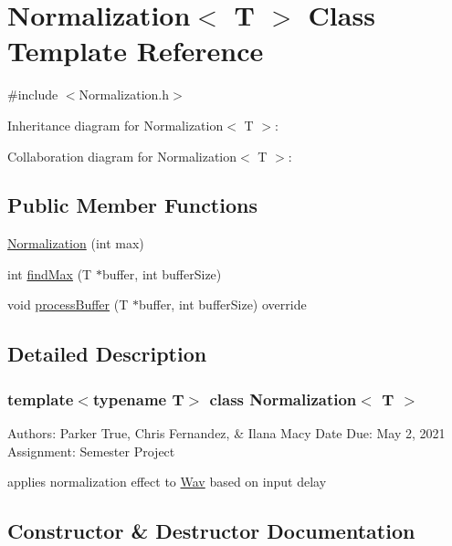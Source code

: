 \hypertarget{classNormalization}{}\section{Normalization$<$ T $>$ Class Template Reference}
\label{classNormalization}


{\ttfamily \#include $<$Normalization.\+h$>$}



Inheritance diagram for Normalization$<$ T $>$\+:


Collaboration diagram for Normalization$<$ T $>$\+:
\subsection*{Public Member Functions}
\begin{DoxyCompactItemize}
\item 
\hyperlink{classNormalization_a70f7d23e000cbdd8c0067a981b44ebe9}{Normalization} (int max)
\item 
int \hyperlink{classNormalization_a0ca4f15e6f0d23ec77c2946583e248b6}{find\+Max} (T $\ast$buffer, int buffer\+Size)
\item 
void \hyperlink{classNormalization_a0f441de817c3dbb8348cb9dfd66879d7}{process\+Buffer} (T $\ast$buffer, int buffer\+Size) override
\end{DoxyCompactItemize}


\subsection{Detailed Description}
\subsubsection*{template$<$typename T$>$\newline
class Normalization$<$ T $>$}

Authors\+: Parker True, Chris Fernandez, \& Ilana Macy Date Due\+: May 2, 2021 Assignment\+: Semester Project

applies normalization effect to \hyperlink{classWav}{Wav} based on input delay 

\subsection{Constructor \& Destructor Documentation}
\mbox{\label{classNormalization_a70f7d23e000cbdd8c0067a981b44ebe9}} 
